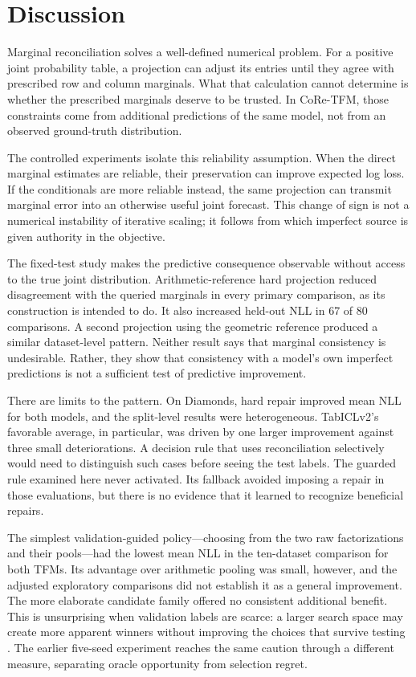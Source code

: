 \documentclass[a4paper,fleqn]{cas-sc}
\begin{document}
\FloatBarrier
\section{Discussion}
Marginal reconciliation solves a well-defined numerical problem. For a positive joint probability table, a projection can adjust its entries until they agree with prescribed row and column marginals. What that calculation cannot determine is whether the prescribed marginals deserve to be trusted. In CoRe-TFM, those constraints come from additional predictions of the same model, not from an observed ground-truth distribution.

The controlled experiments isolate this reliability assumption. When the direct marginal estimates are reliable, their preservation can improve expected log loss. If the conditionals are more reliable instead, the same projection can transmit marginal error into an otherwise useful joint forecast. This change of sign is not a numerical instability of iterative scaling; it follows from which imperfect source is given authority in the objective.

The fixed-test study makes the predictive consequence observable without access to the true joint distribution. Arithmetic-reference hard projection reduced disagreement with the queried marginals in every primary comparison, as its construction is intended to do. It also increased held-out NLL in 67 of 80 comparisons. A second projection using the geometric reference produced a similar dataset-level pattern. Neither result says that marginal consistency is undesirable. Rather, they show that consistency with a model's own imperfect predictions is not a sufficient test of predictive improvement.

There are limits to the pattern. On Diamonds, hard repair improved mean NLL for both models, and the split-level results were heterogeneous. TabICLv2's favorable average, in particular, was driven by one larger improvement against three small deteriorations. A decision rule that uses reconciliation selectively would need to distinguish such cases before seeing the test labels. The guarded rule examined here never activated. Its fallback avoided imposing a repair in those evaluations, but there is no evidence that it learned to recognize beneficial repairs.

The simplest validation-guided policy---choosing from the two raw factorizations and their pools---had the lowest mean NLL in the ten-dataset comparison for both TFMs. Its advantage over arithmetic pooling was small, however, and the adjusted exploratory comparisons did not establish it as a general improvement. The more elaborate candidate family offered no consistent additional benefit. This is unsurprising when validation labels are scarce: a larger search space may create more apparent winners without improving the choices that survive testing \citep{cawley2010overfitting}. The earlier five-seed experiment reaches the same caution through a different measure, separating oracle opportunity from selection regret.
\end{document}
